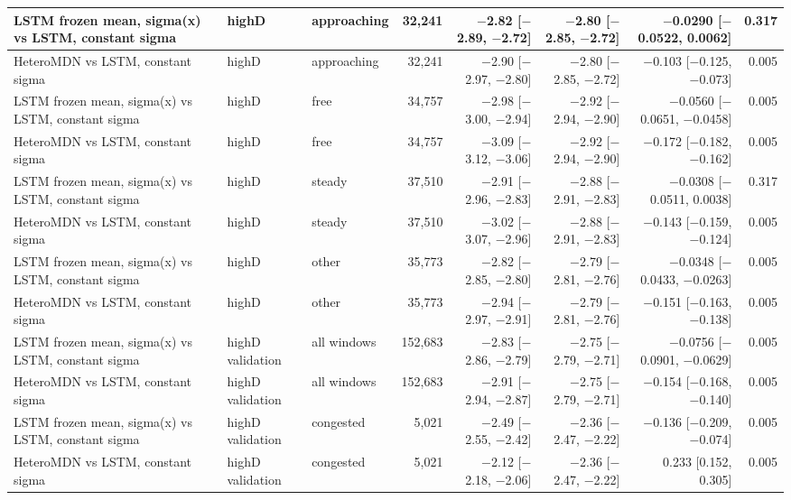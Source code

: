 \begin{longtable}{lllrrrrr}
\midrule
LSTM frozen mean, sigma(x) vs LSTM, constant sigma & highD & approaching & 32,241 & $-$2.82 [$-$2.89, $-$2.72] & $-$2.80 [$-$2.85, $-$2.72] & $-$0.0290 [$-$0.0522, 0.0062] & 0.317 \\
\midrule
HeteroMDN vs LSTM, constant sigma & highD & approaching & 32,241 & $-$2.90 [$-$2.97, $-$2.80] & $-$2.80 [$-$2.85, $-$2.72] & $-$0.103 [$-$0.125, $-$0.073] & 0.005 \\
\midrule
LSTM frozen mean, sigma(x) vs LSTM, constant sigma & highD & free & 34,757 & $-$2.98 [$-$3.00, $-$2.94] & $-$2.92 [$-$2.94, $-$2.90] & $-$0.0560 [$-$0.0651, $-$0.0458] & 0.005 \\
\midrule
HeteroMDN vs LSTM, constant sigma & highD & free & 34,757 & $-$3.09 [$-$3.12, $-$3.06] & $-$2.92 [$-$2.94, $-$2.90] & $-$0.172 [$-$0.182, $-$0.162] & 0.005 \\
\midrule
LSTM frozen mean, sigma(x) vs LSTM, constant sigma & highD & steady & 37,510 & $-$2.91 [$-$2.96, $-$2.83] & $-$2.88 [$-$2.91, $-$2.83] & $-$0.0308 [$-$0.0511, 0.0038] & 0.317 \\
\midrule
HeteroMDN vs LSTM, constant sigma & highD & steady & 37,510 & $-$3.02 [$-$3.07, $-$2.96] & $-$2.88 [$-$2.91, $-$2.83] & $-$0.143 [$-$0.159, $-$0.124] & 0.005 \\
\midrule
LSTM frozen mean, sigma(x) vs LSTM, constant sigma & highD & other & 35,773 & $-$2.82 [$-$2.85, $-$2.80] & $-$2.79 [$-$2.81, $-$2.76] & $-$0.0348 [$-$0.0433, $-$0.0263] & 0.005 \\
\midrule
HeteroMDN vs LSTM, constant sigma & highD & other & 35,773 & $-$2.94 [$-$2.97, $-$2.91] & $-$2.79 [$-$2.81, $-$2.76] & $-$0.151 [$-$0.163, $-$0.138] & 0.005 \\
\midrule
LSTM frozen mean, sigma(x) vs LSTM, constant sigma & highD validation & all windows & 152,683 & $-$2.83 [$-$2.86, $-$2.79] & $-$2.75 [$-$2.79, $-$2.71] & $-$0.0756 [$-$0.0901, $-$0.0629] & 0.005 \\
\midrule
HeteroMDN vs LSTM, constant sigma & highD validation & all windows & 152,683 & $-$2.91 [$-$2.94, $-$2.87] & $-$2.75 [$-$2.79, $-$2.71] & $-$0.154 [$-$0.168, $-$0.140] & 0.005 \\
\midrule
LSTM frozen mean, sigma(x) vs LSTM, constant sigma & highD validation & congested & 5,021 & $-$2.49 [$-$2.55, $-$2.42] & $-$2.36 [$-$2.47, $-$2.22] & $-$0.136 [$-$0.209, $-$0.074] & 0.005 \\
\midrule
HeteroMDN vs LSTM, constant sigma & highD validation & congested & 5,021 & $-$2.12 [$-$2.18, $-$2.06] & $-$2.36 [$-$2.47, $-$2.22] & 0.233 [0.152, 0.305] & 0.005 \\

\end{longtable}
